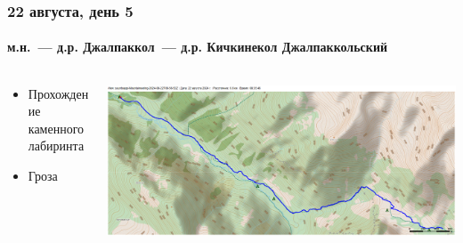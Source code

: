 \begin{frame}
	\frametitle{22 августа, день 5}
	\framesubtitle{м.н.~--- д.р. Джалпаккол~--- д.р. Кичкинекол Джалпаккольский} %
	\begin{columns}[c] %
		\begin{column}{0.45\textwidth} %
			\begin{itemize}
				\item Прохождение каменного лабиринта
				\item Гроза
			\end{itemize}
			
		\end{column}
		\begin{column}{0.5\textwidth} %
			\centering
			\includegraphics[width=\linewidth]{../pics/mini_maps/22}
		\end{column}
	\end{columns}
\end{frame}